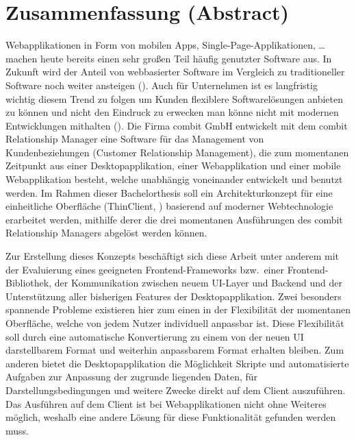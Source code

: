 \chapter{Zusammenfassung (Abstract)}

Webapplikationen in Form von mobilen Apps, Single-Page-Applikationen, \ldots {} machen heute bereits einen sehr großen Teil häufig genutzter Software aus.
In Zukunft wird der Anteil von webbasierter Software im Vergleich zu traditioneller Software noch weiter ansteigen ().
Auch für Unternehmen ist es langfristig wichtig diesem Trend zu folgen um Kunden flexiblere Softwarelösungen anbieten zu können und nicht den Eindruck zu erwecken man könne nicht mit modernen Entwicklungen mithalten ().
Die Firma combit GmbH entwickelt mit dem combit Relationship Manager eine Software für das Management von Kundenbeziehungen (Customer Relationship Management), die zum momentanen Zeitpunkt aus einer Desktopapplikation, einer Webapplikation und einer mobile Webapplikation besteht, welche unabhängig voneinander entwickelt und benutzt werden.
Im Rahmen dieser Bachelorthesis soll ein Architekturkonzept für eine einheitliche Oberfläche (ThinClient, ) basierend auf moderner Webtechnologie erarbeitet werden, mithilfe derer die drei momentanen Ausführungen des combit Relationship Managers abgelöst werden können.

Zur Erstellung dieses Konzepts beschäftigt sich diese Arbeit unter anderem mit der Evaluierung eines geeigneten Frontend-Frameworks bzw.\ einer Frontend-Bibliothek, der Kommunikation zwischen neuem UI-Layer und Backend und der Unterstützung aller bisherigen Features der Desktopapplikation.
Zwei besonders spannende Probleme existieren hier zum einen in der Flexibilität der momentanen Oberfläche, welche von jedem Nutzer individuell anpassbar ist. Diese Flexibilität soll durch eine automatische Konvertierung zu einem von der neuen UI darstellbarem Format und weiterhin anpassbarem Format erhalten bleiben. 
Zum anderen bietet die Desktopapplikation die Möglichkeit Skripte und automatisierte Aufgaben zur Anpassung der zugrunde liegenden Daten, für Darstellungsbedingungen und weitere Zwecke direkt auf dem Client auszuführen. Das Ausführen auf dem Client ist bei Webapplikationen nicht ohne Weiteres möglich, weshalb eine andere Lösung für diese Funktionalität gefunden werden muss.
